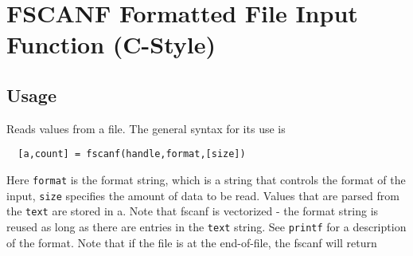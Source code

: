 \section{FSCANF Formatted File Input Function (C-Style)}

\subsection{Usage}

Reads values from a file.  The general syntax for its use is
\begin{verbatim}
  [a,count] = fscanf(handle,format,[size])
\end{verbatim}
Here \verb|format| is the format string, which is a string that
controls the format of the input, \verb|size| specifies the amount of data to be read. Values that are parsed
from the \verb|text| are stored in a. Note that fscanf is vectorized - the format string is reused as long as
there are entries in the \verb|text| string.
See \verb|printf| for a description of the format.  Note that if
the file is at the end-of-file, the fscanf will return 
